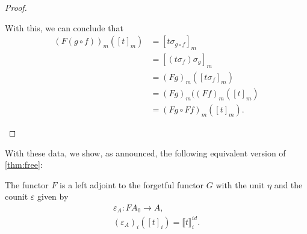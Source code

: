 \documentclass[a4paper,UKenglish,cleveref,thm-restate,numberwithinsect,final]{lipics-v2021}
\theoremstyle{plain}
\newcommand{\id}{\mathit{id}}
\numberwithin{equation}{section}
\newcommand{\+}[1]{\mathcal{#1}\xspace}
\theoremstyle{definition}
\begin{document}
\begin{proof}
\begin{enumerate}[wide]
            With this, we can conclude that
            \begin{align*}
                (F(g \circ f))_m([t]_m)
                &= [t\sigma_{g \circ f}]_m \\
                &= [(t\sigma_f)\sigma_g]_m \\
                &= (Fg)_m([t\sigma_f]_m) \\
                &= (Fg)_m((Ff)_m([t]_m) \\
                &= (Fg \circ Ff)_m([t]_m).
            \end{align*}
    \end{enumerate}
\end{proof}
\noindent With these data, we show, as announced, the following equivalent version of \cref{thm:free}:
\begin{theorem}\label{thm:adjunction}
    The functor \(F\) is a left adjoint to the forgetful functor \(G\) with the unit \(\eta\) and the counit \(\varepsilon\) given by
    \begin{gather*}
        \varepsilon_A\colon FA_0 \to A, \\
        (\varepsilon_A)_i([t]_i) = \llbracket t \rrbracket^{\id}_i.
    \end{gather*}
\end{theorem}
\end{document}
